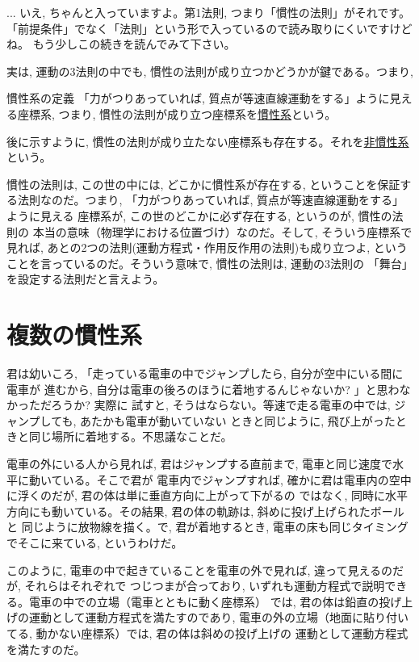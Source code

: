 \begin{faq}{\small{}
... いえ, ちゃんと入っていますよ。第1法則, つまり「慣性の法則」がそれです。
「前提条件」でなく「法則」という形で入っているので読み取りにくいですけどね。
もう少しこの続きを読んでみて下さい。}\end{faq}

実は, 運動の3法則の中でも, 慣性の法則が成り立つかどうかが鍵である。つまり, 
\begin{itembox}{慣性系の定義}
「力がつりあっていれば, 質点が等速直線運動をする」ように見える座標系, 
つまり, 慣性の法則が成り立つ座標系を\underline{慣性系}という。
\end{itembox}

後に示すように, 慣性の法則が成り立たない座標系も存在する。それを\underline{非慣性系}
という。

慣性の法則は, この世の中には, どこかに慣性系が存在する, 
ということを保証する法則なのだ。つまり, 「力がつりあっていれば, 質点が等速直線運動をする」ように見える
座標系が, この世のどこかに必ず存在する, というのが, 慣性の法則の
本当の意味（物理学における位置づけ）なのだ。そして, そういう座標系で見れば, 
あとの2つの法則(運動方程式・作用反作用の法則)も成り立つよ, という
ことを言っているのだ。そういう意味で, 慣性の法則は, 運動の3法則の
「舞台」を設定する法則だと言えよう。\mv


\section{複数の慣性系}

君は幼いころ, 「走っている電車の中でジャンプしたら, 自分が空中にいる間に電車が
進むから, 自分は電車の後ろのほうに着地するんじゃないか? 」と思わなかっただろうか? 実際に
試すと, そうはならない。等速で走る電車の中では, ジャンプしても, あたかも電車が動いていない
ときと同じように, 飛び上がったときと同じ場所に着地する。不思議なことだ。

電車の外にいる人から見れば, 君はジャンプする直前まで, 電車と同じ速度で水平に動いている。そこで君が
電車内でジャンプすれば, 確かに君は電車内の空中に浮くのだが, 君の体は単に垂直方向に上がって下がるの
ではなく, 同時に水平方向にも動いている。その結果, 君の体の軌跡は, 斜めに投げ上げられたボールと
同じように放物線を描く。で, 君が着地するとき, 電車の床も同じタイミングでそこに来ている, というわけだ。

このように, 電車の中で起きていることを電車の外で見れば, 違って見えるのだが, それらはそれぞれで
つじつまが合っており, いずれも運動方程式で説明できる。電車の中での立場（電車とともに動く座標系）
では, 君の体は鉛直の投げ上げの運動として運動方程式を満たすのであり, 
電車の外の立場（地面に貼り付いてる, 動かない座標系）では, 君の体は斜めの投げ上げの
運動として運動方程式を満たすのだ。\mv

